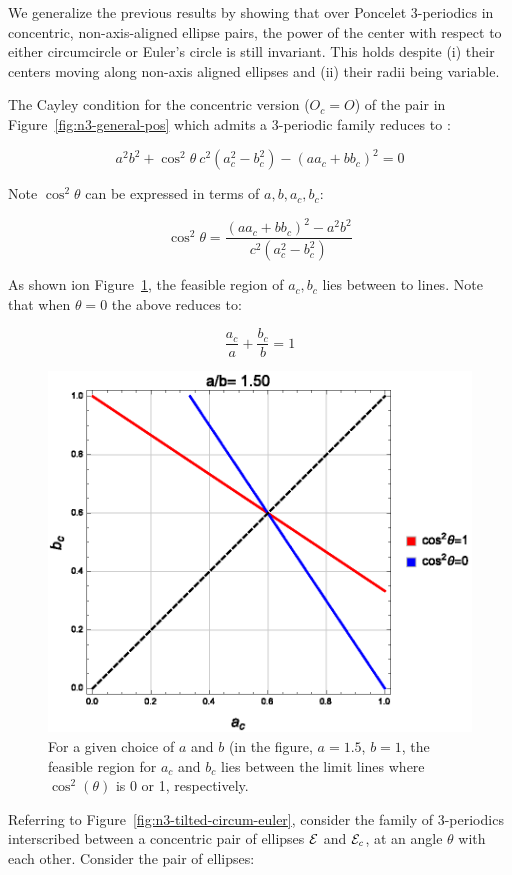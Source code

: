 We generalize the previous results by showing that over Poncelet 3-periodics in concentric, non-axis-aligned ellipse pairs, the power of the center with respect to either circumcircle or Euler's circle
is still invariant. This holds despite (i) their centers moving along non-axis aligned ellipses and (ii) their radii being variable.

The Cayley condition for the concentric version ($O_c=O$) of the pair in Figure~\ref{fig:n3-general-pos} which admits a 3-periodic family reduces to \cite{dragovic11}: 


\[ a^2 b^2+\cos^2{\theta}~c^2 (a_c^2-b_c^2)-(a a_c+b b_c)^2 = 0\]

Note $\cos^2{\theta}$ can be expressed in terms of $a,b,a_c,b_c$:


\[ \cos^2{\theta} =  \frac{(a a_c+b b_c)^2-a^2 b^2}{c^2 (a_c^2-b_c^2)} \]

As shown ion Figure~\ref{fig:cos-limits}, the feasible region of $a_c,b_c$ lies between to lines. Note that when $\theta=0$ the above reduces to:

\[ \frac{a_c}{a}+\frac{b_c}{b}=1 \]

\begin{figure}
    \centering
    \includegraphics[width=.5\textwidth]{pics/0010_cayley_cos.eps}
    \caption{For a given choice of $a$ and $b$ (in the figure, $a=1.5$, $b=1$, the feasible region for $a_c$ and $b_c$ lies between the limit lines where $\cos^2(\theta)$ is 0 or 1, respectively.}
    \label{fig:cos-limits}
\end{figure}


 
Referring to Figure~\ref{fig:n3-tilted-circum-euler}, consider the family of 3-periodics interscribed between a concentric pair of ellipses $\mathcal{E}$ and $\mathcal{E}_c$, at an angle $\theta$ with each other.
Consider the pair of ellipses:

